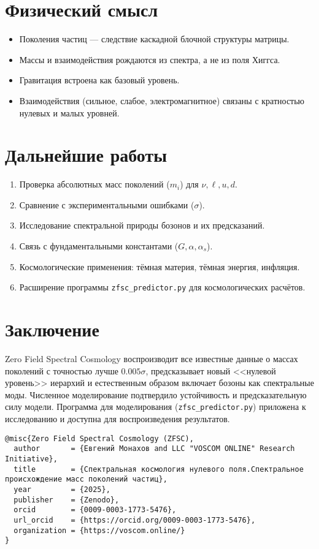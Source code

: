 \documentclass[12pt,a4paper]{article}
\begin{document}
\section{Физический смысл}
\begin{itemize}
  \item Поколения частиц --- следствие каскадной блочной структуры матрицы.
  \item Массы и взаимодействия рождаются из спектра, а не из поля Хиггса.
  \item Гравитация встроена как базовый уровень.
  \item Взаимодействия (сильное, слабое, электромагнитное) связаны с кратностью нулевых и малых уровней.
\end{itemize}

\section{Дальнейшие работы}
\begin{enumerate}
  \item Проверка абсолютных масс поколений ($m_i$) для $\nu, \ell, u, d$.
  \item Сравнение с экспериментальными ошибками ($\sigma$).
  \item Исследование спектральной природы бозонов и их предсказаний.
  \item Связь с фундаментальными константами ($G, \alpha, \alpha_s$).
  \item Космологические применения: тёмная материя, тёмная энергия, инфляция.
  \item Расширение программы \texttt{zfsc\_predictor.py} для космологических расчётов.
\end{enumerate}

\section{Заключение}
Zero Field Spectral Cosmology воспроизводит все известные данные о массах поколений с точностью лучше $0.005\sigma$, предсказывает новый <<нулевой уровень>> иерархий и естественным образом включает бозоны как спектральные моды. 
Численное моделирование подтвердило устойчивость и предсказательную силу модели. 
Программа для моделирования (\texttt{zfsc\_predictor.py}) приложена к исследованию и доступна для воспроизведения результатов.

\begin{verbatim}
@misc{Zero Field Spectral Cosmology (ZFSC),
  author       = {Евгений Монахов and LLC "VOSCOM ONLINE" Research Initiative},
  title        = {Спектральная космология нулевого поля.Спектральное происхождение масс поколений частиц},
  year         = {2025},
  publisher    = {Zenodo},
  orcid        = {0009-0003-1773-5476},
  url_orcid    = {https://orcid.org/0009-0003-1773-5476},
  organization = {https://voscom.online/}
}
\end{verbatim}
\end{document}
